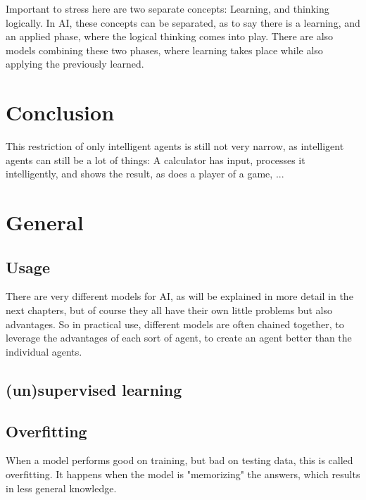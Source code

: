Important to stress here are two separate concepts: Learning, and thinking logically.
In AI, these concepts can be separated, as to say there is a learning, and an applied phase, where the logical thinking comes into play. %
There are also models combining these two phases, where learning takes place while also applying the previously learned. %

\section{Conclusion}
This restriction of only intelligent agents is still not very narrow, as intelligent agents can still be a lot of things: A calculator has input, processes it intelligently, and shows the result, as does a player of a game, ...

\section{General}
\subsection{Usage}
There are very different models for AI, as will be explained in more detail in the next chapters, but of course they all have their own little problems but also advantages. So in practical use, different models are often chained together, to leverage the advantages of each sort of agent, to create an agent better than the individual agents. %
\subsection{(un)supervised learning}
\subsection{Overfitting}
When a model performs good on training, but bad on testing data, this is called overfitting. It happens when the model is "memorizing" the answers, which results in less general knowledge.